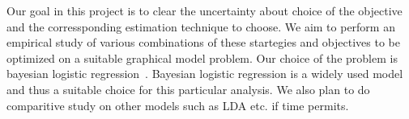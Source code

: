 Our goal in this project is to clear the uncertainty about choice of the
objective and the corressponding estimation technique to choose. We aim to
perform an empirical study of various combinations of these startegies and
objectives to be optimized on a suitable graphical model problem. Our choice of
the problem is bayesian logistic regression~\cite{Xu:2008:BLR}. Bayesian
logistic regression is a widely used model and thus a suitable choice for this
particular analysis. We also plan to do comparitive study on other models such
as LDA etc. if time permits.
